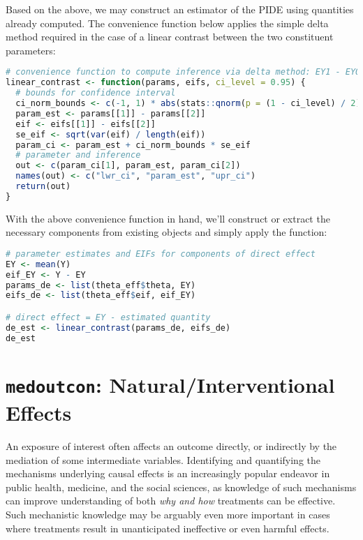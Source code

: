 \documentclass[
  12pt,
]{book}
\theoremstyle{definition}
\theoremstyle{definition}
\theoremstyle{definition}
\newcommand{\1}{\mathbbm{1}}
\begin{document}
Based on the above, we may construct an estimator of the PIDE using quantities
already computed. The convenience function below applies the simple delta method
required in the case of a linear contrast between the two constituent
parameters:

\begin{lstlisting}[language=R]
# convenience function to compute inference via delta method: EY1 - EY0
linear_contrast <- function(params, eifs, ci_level = 0.95) {
  # bounds for confidence interval
  ci_norm_bounds <- c(-1, 1) * abs(stats::qnorm(p = (1 - ci_level) / 2))
  param_est <- params[[1]] - params[[2]]
  eif <- eifs[[1]] - eifs[[2]]
  se_eif <- sqrt(var(eif) / length(eif))
  param_ci <- param_est + ci_norm_bounds * se_eif
  # parameter and inference
  out <- c(param_ci[1], param_est, param_ci[2])
  names(out) <- c("lwr_ci", "param_est", "upr_ci")
  return(out)
}
\end{lstlisting}

With the above convenience function in hand, we'll construct or extract the
necessary components from existing objects and simply apply the function:

\begin{lstlisting}[language=R]
# parameter estimates and EIFs for components of direct effect
EY <- mean(Y)
eif_EY <- Y - EY
params_de <- list(theta_eff$theta, EY)
eifs_de <- list(theta_eff$eif, eif_EY)

# direct effect = EY - estimated quantity
de_est <- linear_contrast(params_de, eifs_de)
de_est
\end{lstlisting}

\hypertarget{medoutcon-naturalinterventional-effects}{%
\section{\texorpdfstring{\texttt{medoutcon}: Natural/Interventional Effects}{medoutcon: Natural/Interventional Effects}}\label{medoutcon-naturalinterventional-effects}}

An exposure of interest often affects an outcome directly, or indirectly by the
mediation of some intermediate variables. Identifying and quantifying the
mechanisms underlying causal effects is an increasingly popular endeavor in
public health, medicine, and the social sciences, as knowledge of such
mechanisms can improve understanding of both \emph{why and how} treatments can be
effective. Such mechanistic knowledge may be arguably even more important in
cases where treatments result in unanticipated ineffective or even harmful
effects.
\end{document}
